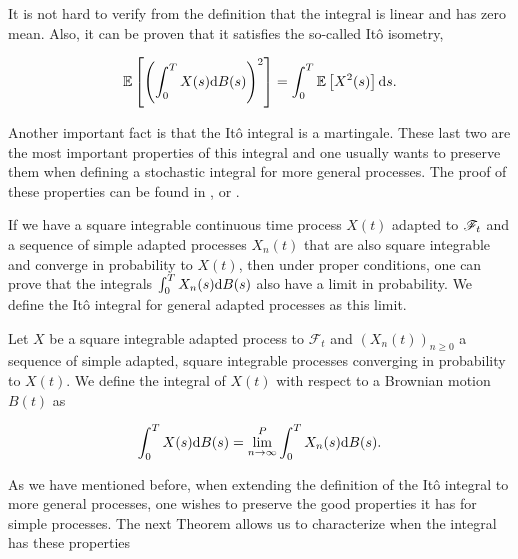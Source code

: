 It is not hard to verify from the definition that the integral is linear and has zero mean. Also, it can be proven that it satisfies the so-called Itô isometry,

\begin{equation*}
    \mathbb E \left[  \left( \int_0^T X(s) \mathrm d B(s)\right)^2  \right] = \int_0^T \mathbb E \left[ X^2(s) \right] \mathrm d s.
\end{equation*}

Another important fact is that the Itô integral is a martingale. These last two are the most important properties of this integral and one usually wants to preserve them when defining a stochastic integral for more general processes. The proof of these properties can be found in \cite{book:legall}, \cite{book:klebaner} or \cite{book:karatzas}.

If we have a square integrable continuous time process $X(t)$ adapted to $\mathscr F_t$ and a sequence of simple adapted processes $X_n(t)$ that are also square integrable and converge in probability to $X(t)$, then under proper conditions, one can prove that the integrals $\int_0^T X_n(s)\mathrm d B(s)$ also have a limit in probability. We define the Itô integral for general adapted processes as this limit.

\begin{definition}
    Let $X$ be a square integrable adapted process to $\mathscr F_t$ and $(X_n(t))_{n\ge 0}$ a sequence of simple adapted, square integrable processes converging in probability to $X(t)$. We define the integral of $X(t)$ with respect to a Brownian motion $B(t)$ as

    \begin{equation*}
        \int_0^T X(s) \mathrm d B(s) = \lim_{n\to\infty}^P \int_0^T X_n(s) \mathrm d B(s).
    \end{equation*}
\end{definition}

As we have mentioned before, when extending the definition of the Itô integral to more general processes, one wishes to preserve the good properties it has for simple processes. The next Theorem allows us to characterize when the integral has these properties

